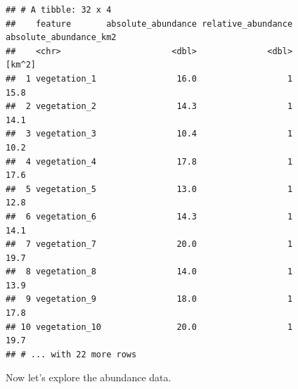 \documentclass[
  12pt,
]{book}
\newenvironment{Shaded}{\begin{snugshade}}{\end{snugshade}}
\newcommand{\CommentTok}[1]{\textcolor[rgb]{0.56,0.35,0.01}{\textit{#1}}}
\newcommand{\DecValTok}[1]{\textcolor[rgb]{0.00,0.00,0.81}{#1}}
\newcommand{\FunctionTok}[1]{\textcolor[rgb]{0.00,0.00,0.00}{#1}}
\newcommand{\NormalTok}[1]{#1}
\newcommand{\OtherTok}[1]{\textcolor[rgb]{0.56,0.35,0.01}{#1}}
\newcommand{\SpecialCharTok}[1]{\textcolor[rgb]{0.00,0.00,0.00}{#1}}
\begin{document}
\begin{Shaded}
\end{Shaded}

\begin{verbatim}
## # A tibble: 32 x 4
##    feature       absolute_abundance relative_abundance absolute_abundance_km2
##    <chr>                      <dbl>              <dbl>                 [km^2]
##  1 vegetation_1                16.0                  1                   15.8
##  2 vegetation_2                14.3                  1                   14.1
##  3 vegetation_3                10.4                  1                   10.2
##  4 vegetation_4                17.8                  1                   17.6
##  5 vegetation_5                13.0                  1                   12.8
##  6 vegetation_6                14.3                  1                   14.1
##  7 vegetation_7                20.0                  1                   19.7
##  8 vegetation_8                14.0                  1                   13.9
##  9 vegetation_9                18.0                  1                   17.8
## 10 vegetation_10               20.0                  1                   19.7
## # ... with 22 more rows
\end{verbatim}

Now let's explore the abundance data.

\begin{Shaded}
\end{Shaded}
\end{document}
